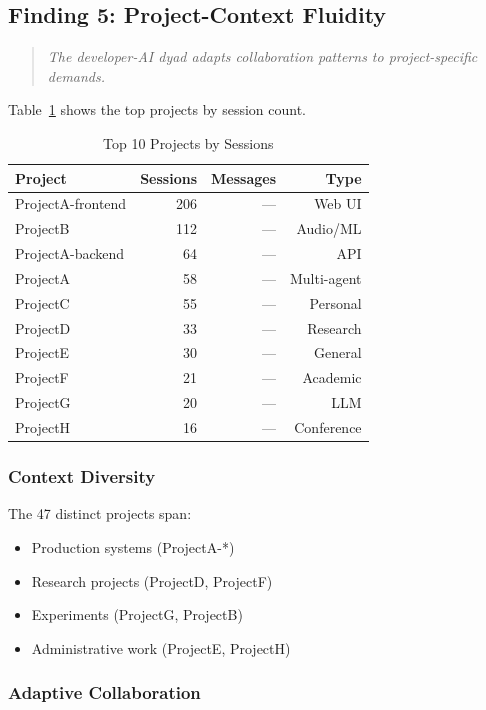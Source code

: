 \documentclass{ntlabs-preprint}
\begin{document}
\subsection{Finding 5: Project-Context Fluidity}

\begin{quote}
\textit{The developer-AI dyad adapts collaboration patterns to project-specific demands.}
\end{quote}

Table~\ref{tab:projects} shows the top projects by session count.

\begin{table}[h]
\centering
\caption{Top 10 Projects by Sessions}
\label{tab:projects}
\begin{tabular}{lrrr}
\toprule
\textbf{Project} & \textbf{Sessions} & \textbf{Messages} & \textbf{Type} \\
\midrule
ProjectA-frontend & 206 & --- & Web UI \\
ProjectB & 112 & --- & Audio/ML \\
ProjectA-backend & 64 & --- & API \\
ProjectA & 58 & --- & Multi-agent \\
ProjectC & 55 & --- & Personal \\
ProjectD & 33 & --- & Research \\
ProjectE & 30 & --- & General \\
ProjectF & 21 & --- & Academic \\
ProjectG & 20 & --- & LLM \\
ProjectH & 16 & --- & Conference \\
\bottomrule
\end{tabular}
\end{table}

\subsubsection{Context Diversity}

The 47 distinct projects span:
\begin{itemize}
    \item Production systems (ProjectA-*)
    \item Research projects (ProjectD, ProjectF)
    \item Experiments (ProjectG, ProjectB)
    \item Administrative work (ProjectE, ProjectH)
\end{itemize}

\subsubsection{Adaptive Collaboration}
\end{document}
